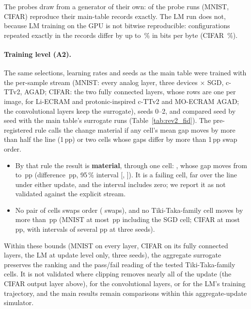 The probes draw from a generator of their own: \RXProbeRunsEqualEThree{} of the \RXProbeRunsN{} probe runs (MNIST, CIFAR)
reproduce their main-table records exactly. The LM run does not, because LM training on the GPU is not bitwise reproducible:
configurations repeated exactly in the records differ by up to \RXReproLmMaxPct\,\% in bits per byte (CIFAR
\RXReproCifarMaxPct\,\%).

\paragraph{Training level (A2).} The same selections, learning rates and seeds as the main table were trained with the
per-sample stream (MNIST: every analog layer, three devices $\times$ SGD, c-TTv2, AGAD; CIFAR: the two fully connected layers,
whose rows are one per image, for Li-ECRAM and protonic-inspired c-TTv2 and MO-ECRAM AGAD; the convolutional layers keep the
surrogate), seeds 0--2, and compared seed by seed with the main table's surrogate runs (Table~\ref{tab:rev2_fid}). The
pre-registered rule calls the change material if any cell's mean gap moves by more than half the line (1\,pp) or two cells
whose gaps differ by more than 1\,pp swap order.
\begin{itemize}
\item By that rule the result is \textbf{material}, through one cell: \RXFidMaterialList, whose gap moves from
      \RXFidMnistEcramMoKimTwoZeroOneNineSgdSur{} to \RXFidMnistEcramMoKimTwoZeroOneNineSgdSeq\,pp
      (difference \RXFidMnistEcramMoKimTwoZeroOneNineSgdD\,pp, 95\,\% interval [\RXFidMnistEcramMoKimTwoZeroOneNineSgdLo,
      \RXFidMnistEcramMoKimTwoZeroOneNineSgdHi]). It is a failing cell, far over the line under either update, and the interval
      includes zero; we report it as not validated against the explicit stream.
\item No pair of cells swaps order (\RXFidSwapsN{} swaps), and no Tiki-Taka-family cell moves by more than
      \RXFidTtMaxAbs\,pp (MNIST at most \RXFidMnistMaxAbs\,pp including the SGD cell; CIFAR at most \RXFidCifarMaxAbs\,pp, with
      intervals of several pp at three seeds).
\end{itemize}
Within these bounds (MNIST on every layer, CIFAR on its fully connected layers, the LM at update level only, three seeds), the
aggregate surrogate preserves the ranking and the pass/fail reading of the tested Tiki-Taka-family cells. It is not validated
where clipping removes nearly all of the update (the CIFAR output layer above), for the convolutional layers, or for the LM's
training trajectory, and the main results remain comparisons within this aggregate-update simulator.



